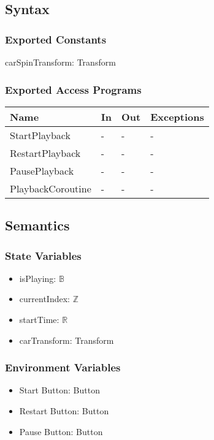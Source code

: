 \documentclass[12pt, titlepage]{article}
\begin{document}
\subsection{Syntax}

\subsubsection{Exported Constants}
carSpinTransform: Transform

\subsubsection{Exported Access Programs}

\begin{center}
\begin{tabular}{p{4cm} p{4cm} p{4cm} p{2cm}}
\hline
\textbf{Name} & \textbf{In} & \textbf{Out} & \textbf{Exceptions} \\
\hline
StartPlayback & - & - & - \\
RestartPlayback & - & - & - \\
PausePlayback & - & - & - \\
PlaybackCoroutine & - & - & - \\
\hline
\end{tabular}
\end{center}

\subsection{Semantics}

\subsubsection{State Variables}

\begin{itemize}
  \item isPlaying: $\mathbb{B}$
  \item currentIndex: $\mathbb{Z}$
  \item startTime: $\mathbb{R}$ 
  \item carTransform: Transform
\end{itemize}

\subsubsection{Environment Variables}

\begin{itemize}
  \item Start Button: Button
  \item Restart Button: Button
  \item Pause Button: Button
\end{itemize}
\end{document}
